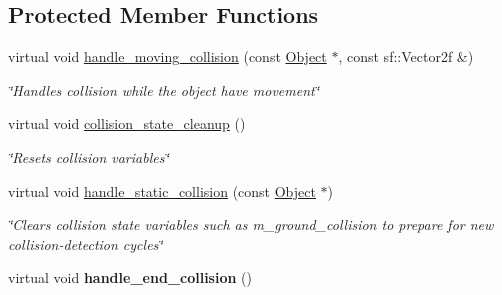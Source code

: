 \subsection*{Protected Member Functions}
\begin{DoxyCompactItemize}
\item 
virtual void \hyperlink{classMovable__Object_a909989f83255795f755742be6db62713}{handle\+\_\+moving\+\_\+collision} (const \hyperlink{classObject}{Object} $\ast$, const sf\+::\+Vector2f \&)
\begin{DoxyCompactList}\small\item\em \char`\"{}\+Handles collision while the object have movement\char`\"{} \end{DoxyCompactList}\item 
\hypertarget{classMovable__Object_a7091c50aa4cd1438424737441e9ff72a}{virtual void \hyperlink{classMovable__Object_a7091c50aa4cd1438424737441e9ff72a}{collision\+\_\+state\+\_\+cleanup} ()}\label{classMovable__Object_a7091c50aa4cd1438424737441e9ff72a}

\begin{DoxyCompactList}\small\item\em \char`\"{}\+Resets collision variables\char`\"{} \end{DoxyCompactList}\item 
\hypertarget{classMovable__Object_a1d92a4bbc7c741bf3d1c65004eab2adb}{virtual void \hyperlink{classMovable__Object_a1d92a4bbc7c741bf3d1c65004eab2adb}{handle\+\_\+static\+\_\+collision} (const \hyperlink{classObject}{Object} $\ast$)}\label{classMovable__Object_a1d92a4bbc7c741bf3d1c65004eab2adb}

\begin{DoxyCompactList}\small\item\em \char`\"{}\+Clears collision state variables such as m\+\_\+ground\+\_\+collision
        to prepare for new collision-\/detection cycles\char`\"{} \end{DoxyCompactList}\item 
\hypertarget{classMovable__Object_a71916586f5f73c836568503dcd7b0eb7}{virtual void {\bfseries handle\+\_\+end\+\_\+collision} ()}\label{classMovable__Object_a71916586f5f73c836568503dcd7b0eb7}

\end{DoxyCompactItemize}
